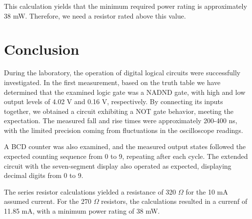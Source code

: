 \documentclass[12pt]{article}
\begin{document}
This calculation yields that the minimum required power rating is approximately 38 mW. Therefore, we need a resistor rated above this value. 

\section{Conclusion}
During the laboratory, the operation of digital logical circuits were successfully investigated. In the first measurement, based on the truth table we have determined that the examined logic gate was a NADND gate, with high and low output levels of 4.02 V and 0.16 V, respectively. By connecting its inputs together, we obtained a circuit exhibiting a NOT gate behavior, meeting the expectation. The measured fall and rise times were approximately 200-400 ns, with the limited precision coming from fluctuations in the oscilloscope readings.

A BCD counter was also examined, and the measured output states followed the expected counting sequence from 0 to 9, repeating after each cycle. The extended circuit with the seven-segment display also operated as expected, displaying decimal digits from 0 to 9.

The series resistor calculations yielded a resistance of 320 $\Omega$ for the 10 mA assumed current. For the 270 $\Omega$ resistors, the calculations resulted in a currenf of 11.85 mA, with a minimum power rating of 38 mW.

\nocite{*}
\printbibliography 
\end{document}
